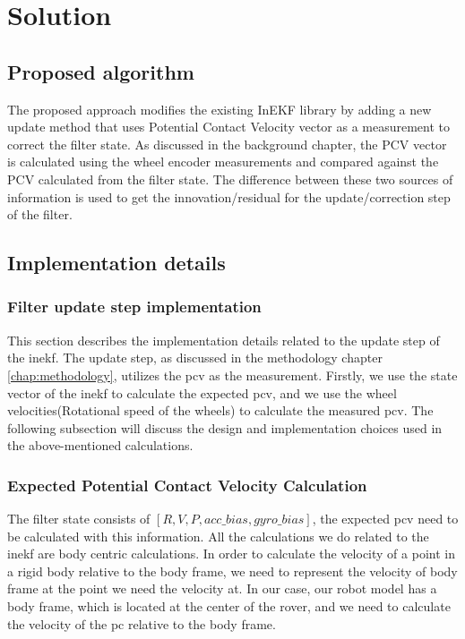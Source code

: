 \documentclass[report.tex]{subfiles}
\begin{document}
    \chapter{Solution} \label{chap:solution}

    \section{Proposed algorithm}
        
        The proposed approach modifies the existing InEKF library by adding a new update method that uses Potential Contact Velocity vector as a measurement to correct the filter state. As discussed in the background chapter, the PCV vector is calculated using the wheel encoder measurements and compared against the PCV calculated from the filter state. The difference between these two sources of information is used to get the innovation/residual for the update/correction step of the filter. 

    \section{Implementation details}
    
    \subsection{Filter update step implementation}
    
        This section describes the implementation details related to the update step of the \gls{inekf}. The update step, as discussed in the methodology chapter \ref{chap:methodology}, utilizes the \gls{pcv} as the measurement. Firstly, we use the state vector of the \gls{inekf} to calculate the expected \gls{pcv}, and we use the wheel velocities(Rotational speed of the wheels) to calculate the measured \gls{pcv}. The following subsection will discuss the design and implementation choices used in the above-mentioned calculations.
    
    \subsection{Expected Potential Contact Velocity Calculation}
        
        The filter state consists of $[R, V, P, acc\_bias, gyro\_bias]$, the expected \gls{pcv} need to be calculated with this information. All the calculations we do related to the \gls{inekf} are  body centric calculations. In order to calculate the velocity of a point in a rigid body relative to the body frame, we need to represent the velocity of body frame at the point we need the velocity at. In our case, our robot model has a body frame, which is located at the center of the rover, and we need to calculate the velocity of the \gls{pc} relative to the body frame. 
        
\end{document}

